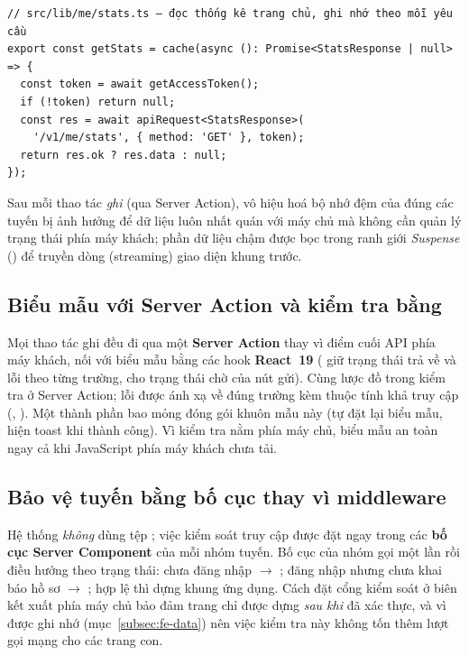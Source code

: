 \begin{verbatim}
// src/lib/me/stats.ts — đọc thống kê trang chủ, ghi nhớ theo mỗi yêu cầu
export const getStats = cache(async (): Promise<StatsResponse | null> => {
  const token = await getAccessToken();
  if (!token) return null;
  const res = await apiRequest<StatsResponse>(
    '/v1/me/stats', { method: 'GET' }, token);
  return res.ok ? res.data : null;
});
\end{verbatim}

Sau mỗi thao tác \textit{ghi} (qua Server Action),  vô
hiệu hoá bộ nhớ đệm của đúng các tuyến bị ảnh hưởng để dữ liệu luôn nhất quán
với máy chủ mà không cần quản lý trạng thái phía máy khách; phần dữ liệu chậm
được bọc trong ranh giới \textit{Suspense} () để truyền dòng
(streaming) giao diện khung trước.

\subsection{Biểu mẫu với Server Action và kiểm tra bằng }
\label{subsec:fe-forms}

Mọi thao tác ghi đều đi qua một \textbf{Server Action} thay vì điểm cuối API
phía máy khách, nối với biểu mẫu bằng các hook \textbf{React~19}
( giữ trạng thái trả về và lỗi theo từng trường,
 cho trạng thái chờ của nút gửi). Cùng lược đồ 
trong  kiểm tra ở Server Action; lỗi được ánh xạ về
đúng trường kèm thuộc tính khả truy cập (,
). Một thành phần bao mỏng  đóng gói
khuôn mẫu này (tự đặt lại biểu mẫu, hiện toast khi thành công). Vì kiểm tra
nằm phía máy chủ, biểu mẫu an toàn ngay cả khi JavaScript phía máy khách chưa
tải.

\subsection{Bảo vệ tuyến bằng bố cục thay vì middleware}
\label{subsec:fe-guard}

Hệ thống \textit{không} dùng tệp ; việc kiểm soát truy cập
được đặt ngay trong các \textbf{bố cục Server Component} của mỗi nhóm tuyến.
Bố cục của nhóm  gọi  một lần rồi điều hướng theo
trạng thái: chưa đăng nhập $\rightarrow$ ; đăng nhập nhưng chưa
khai báo hồ sơ $\rightarrow$ ; hợp lệ thì dựng khung ứng dụng.
Cách đặt cổng kiểm soát ở biên kết xuất phía máy chủ bảo đảm trang chỉ được
dựng \textit{sau khi} đã xác thực, và vì  được ghi nhớ
(mục~\ref{subsec:fe-data}) nên việc kiểm tra này không tốn thêm lượt gọi mạng
cho các trang con.

